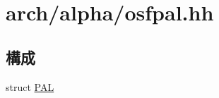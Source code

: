 \hypertarget{osfpal_8hh}{
\section{arch/alpha/osfpal.hh}
\label{osfpal_8hh}
}
\subsection*{構成}
\begin{DoxyCompactItemize}
\item 
struct \hyperlink{structPAL}{PAL}
\end{DoxyCompactItemize}
